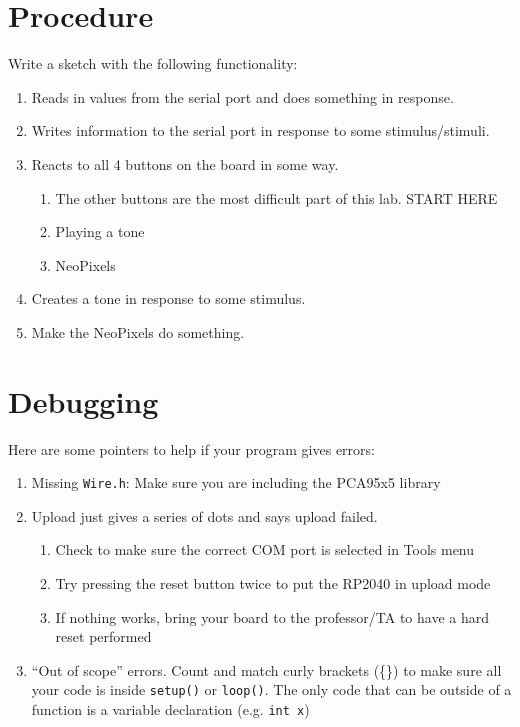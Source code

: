 \section{Procedure}
Write a sketch with the following functionality:
\begin{enumerate}
    \item Reads in values from the serial port and does something in response.
    \item Writes information to the serial port in response to some stimulus/stimuli.
    \item Reacts to all 4 buttons on the board in some way.
    \begin{enumerate}
        \item The other buttons are the most difficult part of this lab. START HERE
        \item Playing a tone
        \item NeoPixels
    \end{enumerate} 
    \item Creates a tone in response to some stimulus.
    \item Make the NeoPixels do something.
\end{enumerate}

\section{Debugging}
Here are some pointers to help if your program gives errors:
\begin{enumerate}
    \item Missing \lstinline|Wire.h|: Make sure you are including the PCA95x5 library
    \item Upload just gives a series of dots and says upload failed.
    \begin{enumerate}
        \item Check to make sure the correct COM port is selected in Tools menu
        \item Try pressing the reset button twice to put the RP2040 in upload mode 
        \item If nothing works, bring your board to the professor/TA to have a hard reset performed
    \end{enumerate}
    \item ``Out of scope'' errors. Count and match curly brackets (\{\}) to make sure all
                your code is inside \lstinline|setup()| or \lstinline|loop()|. The only code
                that can be outside of a function is a variable declaration (e.g. \lstinline|int x|)
\end{enumerate}

